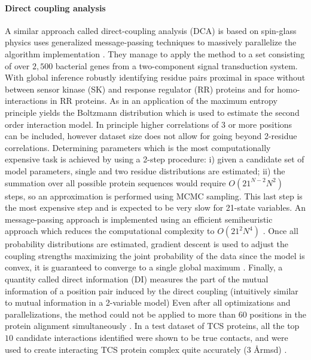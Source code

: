 \paragraph{Direct coupling analysis}
A similar approach called  direct-coupling analysis (DCA) is based on spin-glass physics uses generalized message-passing techniques to massively parallelize the algorithm implementation \cite{weigt2009identification}.
They manage to apply the method to a set consisting of over $2,500$ bacterial genes from a two-component signal transduction system.
With global inference robustly identifying residue pairs proximal in space without between sensor kinase (SK) and response regulator (RR) proteins and for homo-interactions in RR proteins. \cite{weigt2009identification}
As in \cite{lapedes2012using} an application of the maximum entropy principle yields the Boltzmann distribution which is used to estimate the second order interaction model.
In principle higher correlations of 3 or more positions can be included, however dataset size does not allow for going beyond \cite{weigt2009identification} 2-residue correlations. 
Determining parameters which is the most computationally expensive task is achieved by using a 2-step procedure: i) given a candidate set of model parameters, single and two residue distributions are estimated; ii) the summation over all possible protein sequences would require $O(21^{N-2} N^2)$ steps, so an approximation is performed using MCMC sampling. 
This last step is the most expensive step and is expected to be very slow for 21-state variables.
An message-passing approach is implemented using an efficient semiheuristic approach which reduces the computational complexity to $O(21^2 N^4)$ \cite{weigt2009identification}.
Once all probability distributions are estimated, gradient descent is used to adjust the coupling strengths maximizing the joint probability of the data since the model is convex, it is guaranteed to converge to a single global maximum \cite{weigt2009identification}.
Finally, a quantity called direct information (DI) measures the part of the mutual information of a position pair induced by the direct coupling (intuitively similar to mutual information in a 2-variable model) \cite{weigt2009identification}
Even after all optimizations and parallelizations, the method could not be applied to more than $60$ positions in the protein alignment simultaneously \cite{weigt2009identification}.
In a test dataset of TCS proteins, all the top $10$ candidate interactions identified were shown to be true contacts, and were used to create interacting TCS protein complex quite accurately ($3$ \AA rmsd) \cite{morcos2011direct}.

